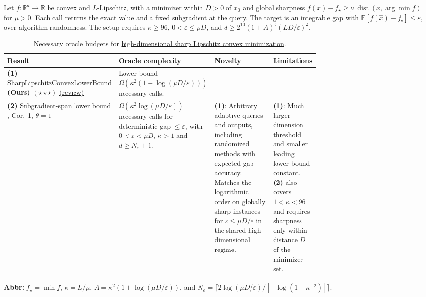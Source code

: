 \begin{table}[tp]
\centering
\caption{Necessary oracle budgets for \href{https://github.com/k3nfalt/longtails/blob/main/LongTails/Setups/HighDimensionalSharpLipschitzConvex.lean}{high-dimensional sharp Lipschitz convex minimization}.}\label{tab:HighDimensionalSharpLipschitzConvex}
\parbox{\linewidth}{\footnotesize Let $f:\mathbb R^d\to\mathbb R$ be convex and $L$-Lipschitz, with a minimizer within $D>0$ of $x_0$ and global sharpness $f(x)-f_\star\ge\mu\,\operatorname{dist}(x,\arg\min f)$ for $\mu>0$. Each call returns the exact value and a fixed subgradient at the query. The target is an integrable gap with $\mathbb E[f(\hat x)-f_\star]\le\varepsilon$, over algorithm randomness. The setup requires $\kappa\ge96$, $0<\varepsilon\le\mu D$, and $d\ge 2^{10}(1+A)^6(LD/\varepsilon)^2$.}\par\smallskip
\begin{threeparttable}
\footnotesize
\setlength{\tabcolsep}{4pt}\renewcommand{\arraystretch}{1.25}
\begin{tabularx}{\linewidth}{@{}>{\raggedright\arraybackslash}p{0.24\linewidth}>{\raggedright\arraybackslash}p{0.25\linewidth}>{\raggedright\arraybackslash}p{0.25\linewidth}>{\raggedright\arraybackslash}X@{}}
\toprule
\textbf{Result} & \textbf{Oracle complexity} & \textbf{Novelty} & \textbf{Limitations} \\
\midrule
\textbf{(1)} \href{https://github.com/k3nfalt/longtails/blob/main/LongTails/Theorems/SharpLipschitzConvexLowerBound.lean}{Sharp\allowbreak{}Lipschitz\allowbreak{}Convex\allowbreak{}Lower\allowbreak{}Bound} \textbf{(Ours)} $(\star\star\star)$ \href{https://github.com/k3nfalt/longtails/blob/main/scripts/reviews/SharpLipschitzConvexLowerBound.md}{(review)} &
Lower bound $\Omega(\kappa^2(1+\log(\mu D/\varepsilon)))$ necessary calls. & & \\
\midrule[1.2pt]
\textbf{(2)} Subgradient-span lower bound \citep{hdsWang2025v1}, Cor.~1, $\theta=1$ &
$\Omega(\kappa^2\log(\mu D/\varepsilon))$ necessary calls for deterministic gap $\le\varepsilon$, with $0<\varepsilon<\mu D$, $\kappa>1$ and $d\ge N_\varepsilon+1$. &
\textbf{(1)}: Arbitrary adaptive queries and outputs, including randomized methods with expected-gap accuracy. Matches the logarithmic order on globally sharp instances for $\varepsilon\le\mu D/e$ in the shared high-dimensional regime. &
\textbf{(1)}: Much larger dimension threshold and smaller leading lower-bound constant. \textbf{(2)} also covers $1<\kappa<96$ and requires sharpness only within distance $D$ of the minimizer set. \\
\bottomrule
\end{tabularx}
\begin{tablenotes}[flushleft]\footnotesize
\item[] \textbf{Abbr:} $f_\star=\min f$, $\kappa=L/\mu$, $A=\kappa^2(1+\log(\mu D/\varepsilon))$, and $N_\varepsilon=\lceil 2\log(\mu D/\varepsilon)/[-\log(1-\kappa^{-2})]\rceil$.
\end{tablenotes}
\end{threeparttable}
\end{table}
